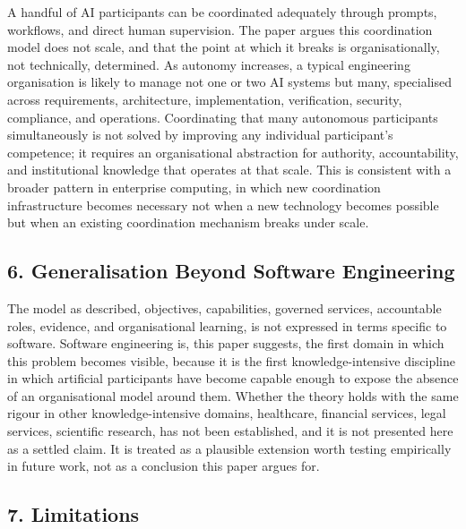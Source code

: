 \documentclass[
  11pt,
]{article}
\begin{document}
A handful of AI participants can be coordinated adequately through
prompts, workflows, and direct human supervision. The paper argues this
coordination model does not scale, and that the point at which it breaks
is organisationally, not technically, determined. As autonomy increases,
a typical engineering organisation is likely to manage not one or two AI
systems but many, specialised across requirements, architecture,
implementation, verification, security, compliance, and operations.
Coordinating that many autonomous participants simultaneously is not
solved by improving any individual participant's competence; it requires
an organisational abstraction for authority, accountability, and
institutional knowledge that operates at that scale. This is consistent
with a broader pattern in enterprise computing, in which new
coordination infrastructure becomes necessary not when a new technology
becomes possible but when an existing coordination mechanism breaks
under scale.

\hypertarget{generalisation-beyond-software-engineering}{%
\subsection{6. Generalisation Beyond Software
Engineering}\label{generalisation-beyond-software-engineering}}

The model as described, objectives, capabilities, governed services,
accountable roles, evidence, and organisational learning, is not
expressed in terms specific to software. Software engineering is, this
paper suggests, the first domain in which this problem becomes visible,
because it is the first knowledge-intensive discipline in which
artificial participants have become capable enough to expose the absence
of an organisational model around them. Whether the theory holds with
the same rigour in other knowledge-intensive domains, healthcare,
financial services, legal services, scientific research, has not been
established, and it is not presented here as a settled claim. It is
treated as a plausible extension worth testing empirically in future
work, not as a conclusion this paper argues for.

\hypertarget{limitations}{%
\subsection{7. Limitations}\label{limitations}}
\end{document}
